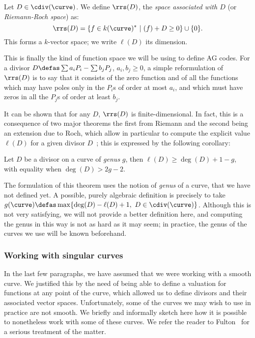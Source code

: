 \begin{defi}
Let $D \in \cdiv(\curve)$. We define $\rrs(D)$, the \emph{space associated with $D$} (or \emph{Riemann-Roch space}) as:
\[
\rrs(D) = \{f \in k(\curve)^*~|~(f) + D \geq 0\} \cup \{0\}.
\]
This forms a $k$-vector space; we write $\ell(D)$ its dimension.
\end{defi}

This is finally the kind of function space we will be using to define AG codes. For a divisor
$D \defas \sum a_iP_i - \sum b_jP_j$, $a_i, b_j \geq 0$, a simple reformulation of $\rrs(D)$ is to say that it consists of the zero function and of all the functions
which may have poles only in the $P_i$s of order at most $a_i$, and which must have zeros in all the $P_j$s of order
at least $b_j$.

It can be shown that for any $D$, $\rrs(D)$ is finite-dimensional. In fact, this is a consequence of two major theorems
the first from Riemann and the second being an extension due to Roch, which allow in particular to compute the explicit value $\ell(D)$
for a given divisor $D$~; this is expressed by the following corollary:

\begin{cor}
Let $D$ be a divisor on a curve of \emph{genus} $g$, then $\ell(D) \geq \deg(D) + 1 - g$, with equality
when $\deg(D) > 2g - 2$.
\end{cor}

The formulation of this theorem uses the notion of \emph{genus} of a curve, that we have not defined yet. A possible, purely algebraic definition is precisely to take
$g(\curve) \defas \max \{\deg(D) - \ell(D) + 1,~D \in \cdiv(\curve)\}$. Although this is not very satisfying, we will not provide a better definition here, and computing
the genus in this way is not as hard as it may seem; in practice, the genus
of the curves we use will be known beforehand.

\subsubsection{Working with singular curves}
\label{sec:nonsingmod}

In the last few paragraphs, we have assumed that we were working with a smooth curve. We justified this by the need of being able to define a valuation for functions
at any point of the curve, which allowed us to define divisors and their associated vector spaces.
Unfortunately, some of the curves we may wish to use in practice are not smooth. We briefly and informally sketch here how it is possible to nonetheless work with some
of these curves. We refer the reader to \eg Fulton~\cite[Chapter 7]{fulton} for a serious treatment of the matter.

